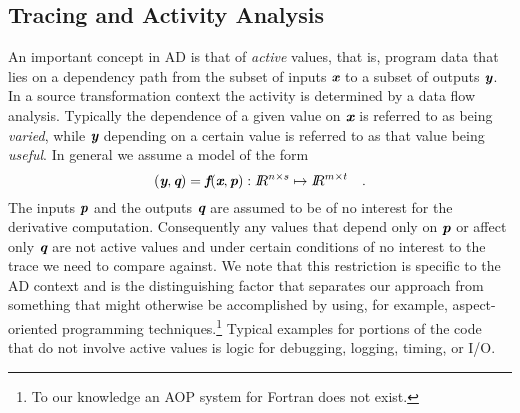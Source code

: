 \documentclass{article}
\newcommand{\R}{I\!\!R}
\newcommand{\bmf}{\mbox{\bf\em f}}
\newcommand{\bmp}{\mbox{\bf\em p}}
\newcommand{\bmq}{\mbox{\bf\em q}}
\newcommand{\bmx}{\mbox{\bf\em x}}
\newcommand{\bmy}{\mbox{\bf\em y}}
\begin{document}
\subsection{Tracing and Activity Analysis}\label{sec:ActivityAnalysis}
An important concept in AD is that of {\em active} values, that is, 
program data that lies on a dependency path from the subset of inputs $\bmx$ to 
a subset of outputs $\bmy$. 
In a source transformation context the activity is determined by a data flow 
analysis. Typically the dependence of a given value on $\bmx$ is 
referred to as being {\em varied}, while $\bmy$ depending on 
a certain value is referred to as that value being {\em useful}.   
In general we assume a model of the form 
\[
(\bmy,\bmq)=\bmf(\bmx,\bmp): \R^{n\times s}\mapsto \R^{m\times t}\quad.
\]
The inputs $\bmp$ and the outputs $\bmq$  are assumed to be of no interest 
for the derivative computation. Consequently any values that depend only on
$\bmp$ or affect only $\bmq$ are not active values and  
under certain conditions of no interest to the trace we need to compare against. 
We note that this restriction is specific to the AD context 
and is the distinguishing factor that separates our  approach  
from something that might otherwise be accomplished 
by using, for example, aspect-oriented programming techniques.\footnote{
To our knowledge an AOP system for Fortran does not exist.
}  
Typical examples for portions of the code that do not involve active values 
is logic for debugging, logging, timing, or I/O.   
\end{document}
